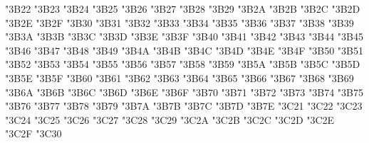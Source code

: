 {\Uchar\jis"3B22 %
\Uchar\jis"3B23 %
\Uchar\jis"3B24 %
\Uchar\jis"3B25 %
\Uchar\jis"3B26 %
\Uchar\jis"3B27 %
\Uchar\jis"3B28 %
\Uchar\jis"3B29 %
\Uchar\jis"3B2A %
\Uchar\jis"3B2B %
\Uchar\jis"3B2C %
\Uchar\jis"3B2D %
\Uchar\jis"3B2E %
\Uchar\jis"3B2F %
\Uchar\jis"3B30 %
\Uchar\jis"3B31 %
\Uchar\jis"3B32 %
\Uchar\jis"3B33 %
\Uchar\jis"3B34 %
\Uchar\jis"3B35 %
\Uchar\jis"3B36 %
\Uchar\jis"3B37 %
\Uchar\jis"3B38 %
\Uchar\jis"3B39 %
\Uchar\jis"3B3A %
\Uchar\jis"3B3B %
\Uchar\jis"3B3C %
\Uchar\jis"3B3D %
\Uchar\jis"3B3E %
\Uchar\jis"3B3F %
\Uchar\jis"3B40 %
\Uchar\jis"3B41 %
\Uchar\jis"3B42 %
\Uchar\jis"3B43 %
\Uchar\jis"3B44 %
\Uchar\jis"3B45 %
\Uchar\jis"3B46 %
\Uchar\jis"3B47 %
\Uchar\jis"3B48 %
\Uchar\jis"3B49 %
\Uchar\jis"3B4A %
\Uchar\jis"3B4B %
\Uchar\jis"3B4C %
\Uchar\jis"3B4D %
\Uchar\jis"3B4E %
\Uchar\jis"3B4F %
\Uchar\jis"3B50 %
\Uchar\jis"3B51 %
\Uchar\jis"3B52 %
\Uchar\jis"3B53 %
\Uchar\jis"3B54 %
\Uchar\jis"3B55 %
\Uchar\jis"3B56 %
\Uchar\jis"3B57 %
\Uchar\jis"3B58 %
\Uchar\jis"3B59 %
\Uchar\jis"3B5A %
\Uchar\jis"3B5B %
\Uchar\jis"3B5C %
\Uchar\jis"3B5D %
\Uchar\jis"3B5E %
\Uchar\jis"3B5F %
\Uchar\jis"3B60 %
\Uchar\jis"3B61 %
\Uchar\jis"3B62 %
\Uchar\jis"3B63 %
\Uchar\jis"3B64 %
\Uchar\jis"3B65 %
\Uchar\jis"3B66 %
\Uchar\jis"3B67 %
\Uchar\jis"3B68 %
\Uchar\jis"3B69 %
\Uchar\jis"3B6A %
\Uchar\jis"3B6B %
\Uchar\jis"3B6C %
\Uchar\jis"3B6D %
\Uchar\jis"3B6E %
\Uchar\jis"3B6F %
\Uchar\jis"3B70 %
\Uchar\jis"3B71 %
\Uchar\jis"3B72 %
\Uchar\jis"3B73 %
\Uchar\jis"3B74 %
\Uchar\jis"3B75 %
\Uchar\jis"3B76 %
\Uchar\jis"3B77 %
\Uchar\jis"3B78 %
\Uchar\jis"3B79 %
\Uchar\jis"3B7A %
\Uchar\jis"3B7B %
\Uchar\jis"3B7C %
\Uchar\jis"3B7D %
\Uchar\jis"3B7E %
\Uchar\jis"3C21 %
\Uchar\jis"3C22 %
\Uchar\jis"3C23 %
\Uchar\jis"3C24 %
\Uchar\jis"3C25 %
\Uchar\jis"3C26 %
\Uchar\jis"3C27 %
\Uchar\jis"3C28 %
\Uchar\jis"3C29 %
\Uchar\jis"3C2A %
\Uchar\jis"3C2B %
\Uchar\jis"3C2C %
\Uchar\jis"3C2D %
\Uchar\jis"3C2E %
\Uchar\jis"3C2F %
\Uchar\jis"3C30 %
}
